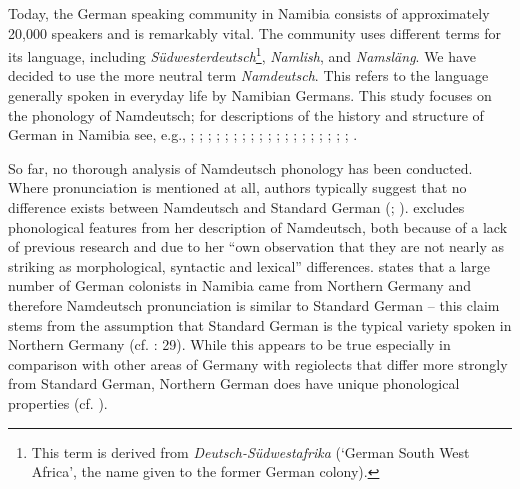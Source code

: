 \documentclass[output=paper]{langsci/langscibook}
\begin{document}
Today, the German speaking community in Namibia consists of approximately 20,000 speakers and is remarkably vital. The community uses different terms for its language, including \textit{Südwesterdeutsch}\footnote{This term is derived from \textit{Deutsch-Südwestafrika} (‘German South West Africa’, the name given to the former German colony).}, \textit{Namlish}, and \textit{Namsläng}. We have decided to use the more neutral term \textit{Namdeutsch}. This refers to the language generally spoken in everyday life by Namibian Germans. This study focuses on the phonology of Namdeutsch; for descriptions of the history and structure of German in Namibia see, e.g., \citet{nockler_sprachmischung_1963}; \citet{putz_sudwesterdeutsch_1991, putz_official_1995}; \citet{gretschel_status_1995}; \citet{schmidt-lauber_verkehrte_1998}; \citet{bohm_deutsch_2003}; \citet{shah_german_2007}; \citet{deumert_namibian_2009, deumert_settler_2018}; \citet{ammon_stellung_2014}; \citet{riehl_sprachkontaktforschung_2004}; \citet{kellermeier-rehbein_namslang_2015};
\citet{wiese_deutsch_2014, wiese_german_2017, Wiese_coherence}; \citet{duck_namibia_2018}; \citet{kroll-tjingaete_strukturelle_2018}; \citet{shah_german_2018}; \citet{stolz_weg_2018}; \citet{zappen-thomson_stutzung_2019}; \citet{zimmer_deutsch_2019, zimmer_kasus_2020, zimmer_wie_nodate, zimmer_siedlungsgeschichte_nodate, zimmer_sprachliche_nodate}; \citet{wiese_registerdifferenzierung_2021}; ; .

So far, no thorough analysis of Namdeutsch phonology has been conducted. Where pronunciation is mentioned at all, authors typically suggest that no difference exists between Namdeutsch and Standard German (\citealt[128]{nockler_sprachmischung_1963}; \citealt[464]{putz_sudwesterdeutsch_1991}). \citet[23]{shah_german_2007} excludes phonological features from her description of Namdeutsch, both because of a lack of previous research and due to her “own observation that they are not nearly as striking as morphological, syntactic and lexical” differences. \citet[564]{bohm_deutsch_2003} states that a large number of German colonists in Namibia came from Northern Germany and therefore Namdeutsch pronunciation is similar to Standard German – this claim stems from the assumption that Standard German is the typical variety spoken in Northern Germany (cf. \citealt{clyne_german_1995}: 29). While this appears to be true especially in comparison with other areas of Germany with regiolects that differ more strongly from Standard German, Northern German does have unique phonological properties (cf. \citealt{elmentaler_norddeutscher_2015}). 
\end{document}
